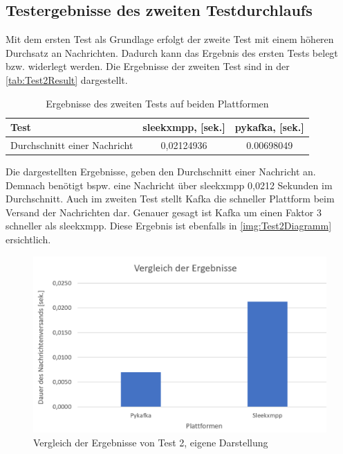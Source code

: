 \documentclass[a4paper,titlepage,halfparskip,12pt]{scrreprt}
\begin{document}
\begin{onehalfspacing}
\subsection*{Testergebnisse des zweiten Testdurchlaufs}
Mit dem ersten Test als Grundlage erfolgt der zweite Test mit einem höheren Durchsatz an Nachrichten. Dadurch kann das Ergebnis des ersten Tests belegt bzw. widerlegt werden. Die Ergebnisse der zweiten Test sind in der \autoref{tab:Test2Result} dargestellt.
\begin{table}[h]
	\centering
	\caption{Ergebnisse des zweiten Tests auf beiden Plattformen}
	\begin{tabular}{l|c|c}
		\textbf{Test} & \textbf{sleekxmpp, [sek.]} & \textbf{pykafka, [sek.]} \\
		\hline
		Durchschnitt einer Nachricht & 0,02124936 & 0.00698049\\
	\end{tabular}
	\label{tab:Test2Result}
\end{table}
Die dargestellten Ergebnisse, geben den Durchschnitt einer Nachricht an. Demnach benötigt bspw. eine Nachricht über sleekxmpp 0,0212 Sekunden im Durchschnitt. Auch im zweiten Test stellt Kafka die schneller Plattform beim Versand der Nachrichten dar. Genauer gesagt ist Kafka um einen Faktor 3 schneller als sleekxmpp. Diese Ergebnis ist ebenfalls in \autoref{img:Test2Diagramm} ersichtlich.
\begin{figure}[h]
	\centering
	\includegraphics[scale=0.8]{images/DiagrammTest2}
	\caption{Vergleich der Ergebnisse von Test 2, eigene Darstellung}
	\label{img:Test2Diagramm}
\end{figure}
\pagebreak


\end{onehalfspacing}
\end{document}
